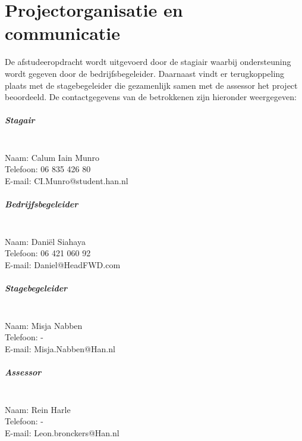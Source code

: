 \chapter{Projectorganisatie en communicatie}
De afstudeeropdracht wordt uitgevoerd door de stagiair waarbij ondersteuning wordt gegeven door de bedrijfsbegeleider. Daarnaast vindt er terugkoppeling plaats met de stagebegeleider die gezamenlijk samen met de assessor het project beoordeeld. De contactgegevens van de betrokkenen zijn hieronder weergegeven:\par
\paragraph{Stagair}~\\
Naam:		Calum Iain Munro\\
Telefoon:	06 835 426 80\\
E-mail:		CI.Munro@student.han.nl

\paragraph{Bedrijfsbegeleider}~\\
Naam:		Dani\"el Siahaya\\
Telefoon:	06 421 060 92\\
E-mail: 	Daniel@HeadFWD.com

\paragraph{Stagebegeleider}~\\
Naam:		Misja Nabben\\
Telefoon:	-\\
E-mail:		Misja.Nabben@Han.nl

\paragraph{Assessor}~\\
Naam:		Rein Harle\\
Telefoon:	-\\
E-mail: 	Leon.bronckers@Han.nl
